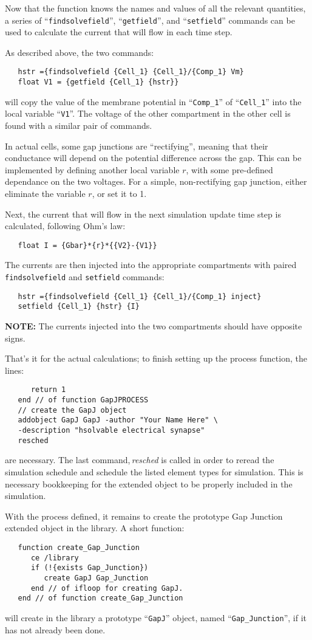 \documentclass[12pt]{article}
\begin{document}
Now that the function knows the names and values of all the relevant quantities, a series of ``{\tt findsolvefield}'', ``{\tt getfield}'', and ``{\tt setfield}'' commands can be used to calculate the current that will flow in each time step.

As described above, the two commands:
\begin{verbatim}
   hstr ={findsolvefield {Cell_1} {Cell_1}/{Comp_1} Vm}
   float V1 = {getfield {Cell_1} {hstr}}
\end{verbatim}
will copy the value of the membrane potential in ``{\tt Comp\_1}'' of ``{\tt Cell\_1}'' into the local variable ``{\tt V1}''. The voltage of the other compartment in the other cell is found with a similar pair of commands.

In actual cells, some gap junctions are ``rectifying'', meaning that their conductance will depend on the potential difference across the gap. This can be implemented by defining another local variable $r$, with some pre-defined dependance on the two voltages. For a simple, non-rectifying gap junction, either eliminate the variable $r$, or set it to 1.

Next, the current that will flow in the next simulation update time step is calculated, following Ohm's law:
\begin{verbatim}
   float I = {Gbar}*{r}*{{V2}-{V1}}
\end{verbatim}
The currents are then injected into the appropriate compartments with paired {\tt findsolvefield} and {\tt setfield} commands:
\begin{verbatim}
   hstr ={findsolvefield {Cell_1} {Cell_1}/{Comp_1} inject}
   setfield {Cell_1} {hstr} {I}
\end{verbatim}
{\bf NOTE:} The currents injected into the two compartments should have opposite signs.

That's it for the actual calculations; to finish setting up the process function, the lines:
\begin{verbatim}
      return 1
   end // of function GapJPROCESS
   // create the GapJ object
   addobject GapJ GapJ -author "Your Name Here" \
   -description "hsolvable electrical synapse"
   resched
\end{verbatim}
are necessary. The last command,\,{\it resched} is called in order to reread the simulation schedule and schedule the listed element types for simulation. This is necessary bookkeeping for the extended object to be properly included in the simulation.

With the process defined, it remains to create the prototype Gap Junction extended object in the library. A short function:
\begin{verbatim}
   function create_Gap_Junction
      ce /library
      if (!{exists Gap_Junction})
         create GapJ Gap_Junction
      end // of ifloop for creating GapJ.
   end // of function create_Gap_Junction
\end{verbatim}
will create in the library a prototype ``{\tt GapJ}'' object, named ``{\tt Gap\_Junction}'', if it has not already been done.
\end{document}
